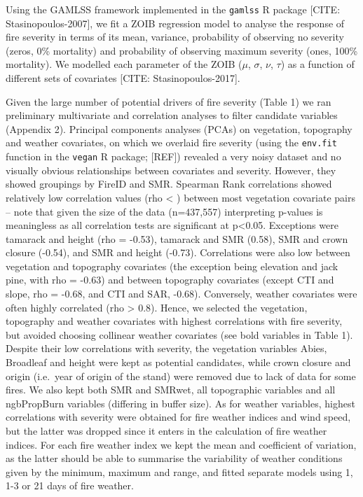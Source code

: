 \documentclass[
  numafflabel,
  authoryear,
  preprint]{elsarticle}
\begin{document}
Using the GAMLSS framework implemented in the \texttt{gamlss} R package
{[}CITE: Stasinopoulos-2007{]}, we fit a ZOIB regression model to
analyse the response of fire severity in terms of its mean, variance,
probability of observing no severity (zeros, 0\% mortality) and
probability of observing maximum severity (ones, 100\% mortality). We
modelled each parameter of the ZOIB (\(\mu\), \(\sigma\), \(\nu\),
\(\tau\)) as a function of different sets of covariates {[}CITE:
Stasinopoulos-2017{]}.

Given the large number of potential drivers of fire severity (Table 1)
we ran preliminary multivariate and correlation analyses to filter
candidate variables (Appendix 2). Principal components analyses (PCAs)
on vegetation, topography and weather covariates, on which we overlaid
fire severity (using the \texttt{env.fit} function in the \texttt{vegan}
R package; {[}REF{]}) revealed a very noisy dataset and no visually
obvious relationships between covariates and severity. However, they
showed groupings by FireID and SMR. Spearman Rank correlations showed
relatively low correlation values (rho \textless{} \textbar)
between most vegetation covariate pairs -- note that given the size of
the data (n=437,557) interpreting p-values is meaningless as all
correlation tests are significant at p\textless0.05. Exceptions were
tamarack and height (rho = -0.53), tamarack and SMR (0.58), SMR and
crown closure (-0.54), and SMR and height (-0.73). Correlations were
also low between vegetation and topography covariates (the exception
being elevation and jack pine, with rho = -0.63) and between topography
covariates (except CTI and slope, rho = -0.68, and CTI and SAR, -0.68).
Conversely, weather covariates were often highly correlated (rho
\textgreater{} 0.8). Hence, we selected the vegetation, topography and
weather covariates with highest correlations with fire severity, but
avoided choosing collinear weather covariates (see bold variables in
Table 1). Despite their low correlations with severity, the vegetation
variables Abies, Broadleaf and height were kept as potential candidates,
while crown closure and origin (i.e.~year of origin of the stand) were
removed due to lack of data for some fires. We also kept both SMR and
SMRwet, all topographic variables and all ngbPropBurn variables
(differing in buffer size). As for weather variables, highest
correlations with severity were obtained for fire weather indices and
wind speed, but the latter was dropped since it enters in the
calculation of fire weather indices. For each fire weather index we kept
the mean and coefficient of variation, as the latter should be able to
summarise the variability of weather conditions given by the minimum,
maximum and range, and fitted separate models using 1, 1-3 or 21 days of
fire weather.
\end{document}
